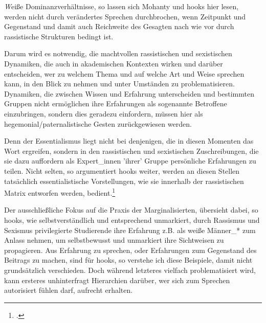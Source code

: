 \textit{W}eiße Dominanzverhältnisse, so lassen sich Mohanty und hooks hier lesen, werden
nicht durch verändertes Sprechen durchbrochen, wenn Zeitpunkt und Gegenstand
und damit auch Reichweite des Gesagten nach wie vor durch rassistische
Strukturen bedingt ist.

Darum wird es notwendig, die machtvollen rassistischen und sexistischen
Dynamiken, die auch in akademischen Kontexten wirken und darüber entscheiden,
wer zu welchem Thema und auf welche Art und Weise sprechen kann, in den Blick
zu nehmen und unter Umständen zu problematisieren. Dynamiken, die zwischen
Wissen und Erfahrung unterscheiden und bestimmten Gruppen nicht ermöglichen
ihre Erfahrungen als sogenannte Betroffene einzubringen, sondern dies geradezu
einfordern, müssen hier als hegemonial/paternalistische Gesten zurückgewiesen
werden.

Denn der Essentialismus liegt nicht bei denjenigen, die in diesen Momenten das
Wort ergreifen, sondern in den rassistischen und sexistischen Zuschreibungen,
die sie dazu auffordern als Expert\_innen 'ihrer' Gruppe persönliche Erfahrungen
zu teilen. Nicht selten, so argumentiert hooks weiter, werden an diesen Stellen
tatsächlich essentialistische Vorstellungen, wie sie innerhalb der
rassistischen Matrix entworfen werden,
bedient.\footnotemark\footcitetext[81]{bellhooks}

Der ausschließliche Fokus auf die Praxis der Marginalisierten, übersieht dabei,
so hooks, wie selbstverständlich und entsprechend unmarkiert, durch Rassismus
und Sexismus privilegierte Studierende ihre Erfahrung z.B. als weiße Männer\_*
zum Anlass nehmen, um selbstbewusst und unmarkiert ihre Sichtweisen zu
propagieren. Aus Erfahrung zu sprechen, oder Erfahrungen zum Gegenstand des
Beitrags zu machen, sind für hooks, so verstehe ich diese Beispiele, damit
nicht grundsätzlich verschieden. Doch während letzteres vielfach
problematisiert wird, kann ersteres unhinterfragt Hierarchien darüber, wer sich
zum Sprechen autorisiert fühlen darf, aufrecht
erhalten.\footnotemark{}

